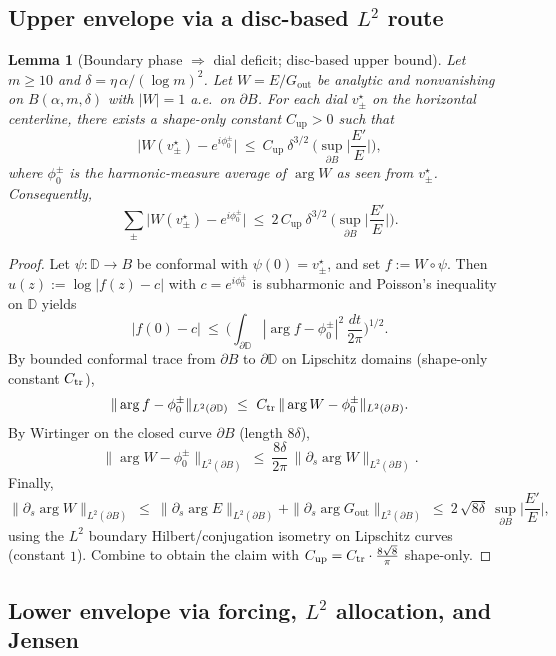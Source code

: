 \documentclass[11pt]{article}
\numberwithin{equation}{section}
\newtheorem{lemma}[theorem]{Lemma}
\theoremstyle{remark}
\newcommand{\D}{\mathbb{D}}
\newcommand{\Gout}{G_{\mathrm{out}}}
\begin{document}
\subsection{Upper envelope via a disc-based $L^2$ route}\label{subsec:upper}

\begin{lemma}[Boundary phase $\Rightarrow$ dial deficit; disc-based upper bound]\label{lem:upper-disc}
Let $m\ge 10$ and $\delta=\eta\,\alpha/(\log m)^2$. Let $W=E/\Gout$ be analytic and nonvanishing on $B(\alpha,m,\delta)$ with $|W|=1$ a.e.\ on $\partial B$. For each dial $v_\pm^\star$ on the horizontal centerline, there exists a shape-only constant $C_{\mathrm{up}}>0$ such that
\[
\big|W(v_\pm^\star)-e^{i\phi_0^\pm}\big|
\ \le\ C_{\mathrm{up}}\ \delta^{3/2}\ \Big(\sup_{\partial B}\Big|\frac{E'}{E}\Big|\Big),
\]
where $\phi_0^\pm$ is the harmonic-measure average of $\arg W$ as seen from $v_\pm^\star$. Consequently,
\[
\sum_{\pm}\big|W(v_\pm^\star)-e^{i\phi_0^\pm}\big|
\ \le\ 2\,C_{\mathrm{up}}\ \delta^{3/2}\ \Big(\sup_{\partial B}\Big|\frac{E'}{E}\Big|\Big).
\]
\end{lemma}

\begin{proof}
Let $\psi:\D\to B$ be conformal with $\psi(0)=v_\pm^\star$, and set $f:=W\circ\psi$. Then $u(z):=\log|f(z)-c|$ with $c=e^{i\phi_0^\pm}$ is subharmonic and Poisson’s inequality on $\D$ yields
\[
|f(0)-c|\ \le\ \Big(\int_{\partial\D}|\arg f-\phi_0^\pm|^2\,\frac{dt}{2\pi}\Big)^{1/2}.
\]
By bounded conformal trace from $\partial B$ to $\partial\D$ on Lipschitz domains (shape-only constant $C_{\rm tr}$),
\[
\|\arg f-\phi_0^\pm\|_{L^2(\partial\D)}\ \le\ C_{\rm tr}\,\|\arg W-\phi_0^\pm\|_{L^2(\partial B)}.
\]
By Wirtinger on the closed curve $\partial B$ (length $8\delta$),
\[
\|\arg W-\phi_0^\pm\|_{L^2(\partial B)}\ \le\ \frac{8\delta}{2\pi}\,\|\partial_s\arg W\|_{L^2(\partial B)}.
\]
Finally,
\[
\|\partial_s\arg W\|_{L^2(\partial B)}\ \le\ \|\partial_s\arg E\|_{L^2(\partial B)}+\|\partial_s\arg \Gout\|_{L^2(\partial B)}
\ \le\ 2\,\sqrt{8\delta}\ \sup_{\partial B}\Big|\frac{E'}{E}\Big|,
\]
using the $L^2$ boundary Hilbert/conjugation isometry on Lipschitz curves (constant $1$). Combine to obtain the claim with $C_{\mathrm{up}}=C_{\rm tr}\cdot\frac{8\sqrt{8}}{\pi}$ shape-only.
\end{proof}

\subsection{Lower envelope via forcing, $L^2$ allocation, and Jensen}\label{subsec:lower-new}
\end{document}
